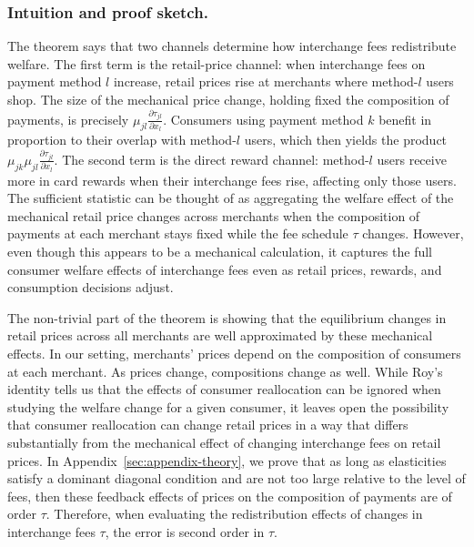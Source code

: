 \documentclass[main.tex]{subfiles}
\begin{document}
\subsubsection{Intuition and proof sketch.}
The theorem says that two channels determine how interchange fees redistribute welfare.
The first term is the retail-price channel: when interchange fees on payment method $l$ increase, retail prices rise at merchants where method-$l$ users shop.
The size of the mechanical price change, holding fixed the composition of payments, is precisely $\mu_{jl} \frac{\partial \tau_{jl}}{\partial x_l}$.
Consumers using payment method $k$ benefit in proportion to their overlap with method-$l$ users, which then yields the product $\mu_{jk}\mu_{jl} \frac{\partial \tau_{jl}}{\partial x_l}$.
The second term is the direct reward channel: method-$l$ users receive more in card rewards when their interchange fees rise, affecting only those users.
The sufficient statistic can be thought of as aggregating the welfare effect of the mechanical retail price changes across merchants when the composition of payments at each merchant stays fixed while the fee schedule $\tau$ changes.
However, even though this appears to be a mechanical calculation, it captures the full consumer welfare effects of interchange fees even as retail prices, rewards, and consumption decisions adjust.

The non-trivial part of the theorem is showing that the equilibrium changes in retail prices across all merchants are well approximated by these mechanical effects.
In our setting, merchants' prices depend on the composition of consumers at each merchant.
As prices change, compositions change as well.
While Roy's identity tells us that the effects of consumer reallocation can be ignored when studying the welfare change for a given consumer, it leaves open the possibility that consumer reallocation can change retail prices in a way that differs substantially from the mechanical effect of changing interchange fees on retail prices.
In Appendix~\ref{sec:appendix-theory}, we prove that as long as elasticities satisfy a dominant diagonal condition and are not too large relative to the level of fees, then these feedback effects of prices on the composition of payments are of order $\tau$.
Therefore, when evaluating the redistribution effects of changes in interchange fees $\tau$, the error is second order in $\tau$.
\end{document}
